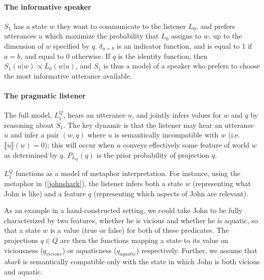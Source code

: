 \documentclass[9pt,twocolumn,twoside,lineno]{pnas-new}
\newcommand{\Listener}{L}
\newcommand{\QLONE}{\Listener_{{1}}^{{Q}}}
\begin{document}
	\paragraph{The informative speaker} $S_1$ has a state $w$ they want to communicate to the listener $L_0$, and prefers utterances $u$ which maximize the probability that $L_0$ assigns to $w$, up to the dimension of $w$ specified by $q$. $\delta_{a=b}$ is an indicator function, and is equal to 1 if $a=b$, and equal to 0 otherwise. If $q$ is the identity function, then $S_1(u|w) \propto L_0(w|u)$, and $S_1$ is thus a model of a speaker who prefers to choose the most informative utterance available. 
	
	\paragraph{The pragmatic listener} The full model, $\QLONE$, hears an utterance $u$, and jointly infers values for $w$ and $q$ by reasoning about $S_1$. The key dynamic is that the listener may hear an utterance $u$ and infer a pair $(w,q)$ where $u$ is semantically incompatible with $w$ (i.e. $\llbracket u\rrbracket(w)=0$); this will occur when $u$ conveys effectively some feature of world $w$ as determined by $q$. $P_{L_Q}(q)$ is the prior probability of projection $q$.

	$\QLONE$ functions as a model of metaphor interpretation. For instance, using the metaphor in (\ref{johnshark}), the listener infers both a state $w$ (representing what John is like) and a feature $q$ (representing which aspects of John are relevant).

	As an example in a hand-constructed setting, we could take John to be fully characterized by two features, whether he is vicious and whether he is aquatic, so that a state $w$ is a value (true or false) for both of these predicates. The projections $q\in Q$ are then the functions mapping a state to its value on viciousness ($q_{vicious}$) or aquaticness ($q_{aquatic}$) respectively. Further, we assume that \emph{shark} is semantically compatible only with the state in which John is both vicious and aquatic.


\end{document}
